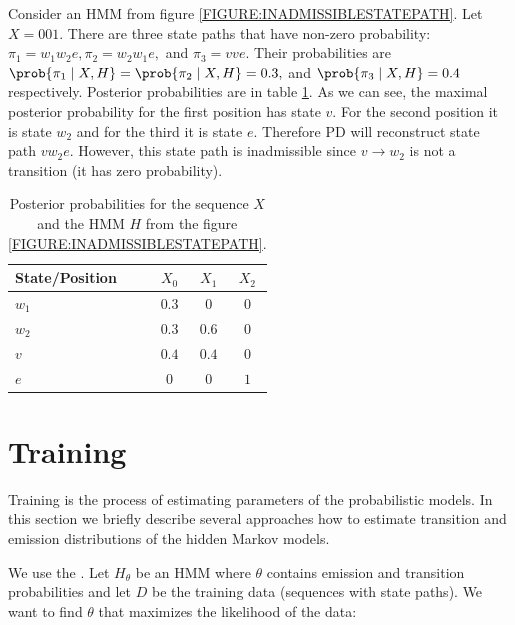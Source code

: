 
\begin{example}
Consider an HMM from figure \ref{FIGURE:INADMISSIBLESTATEPATH}. Let $X=001$. There
are three state paths that have non-zero probability:
$\pi_1=w_1w_2e,\pi_2=w_2w_1e,$ and $\pi_3=vve$. Their probabilities are
$\prob{\pi_1\mid X,H}=\prob{\pi_2\mid X,H}=0.3,$ and $\prob{\pi_3\mid X,H}=0.4$
respectively.
Posterior probabilities are in table \ref{TABLE:INADMISSIBLESTATEPATH}.
As we can see, the maximal posterior probability for the first position has state
$v$. For the second position it is state $w_2$ and for the third it is state
$e$. Therefore PD will reconstruct state path $vw_2e$. However, this state path 
is inadmissible since  $v\to w_2$ is not a transition (it has zero probability).

\begin{table}
\begin{center}
\begin{tabular}{|l|c|c|c|}
\hline
State/Position & $X_0$ & $X_1$ & $X_2$ \\\hline
$w_1$ & $0.3$ & $0$ & $0$ \\\hline
$w_2$ & $0.3$ & $0.6$ & $0$ \\\hline
$v$   & $0.4$ & $0.4$ & $0$\\\hline
$e$  & $0$ & $0$ & $1$ \\\hline
\end{tabular}
\end{center}
\caption[Example of posterior probabilities.]{Posterior probabilities for
the sequence $X$ and the HMM $H$ from the figure \ref{FIGURE:INADMISSIBLESTATEPATH}.
}\label{TABLE:INADMISSIBLESTATEPATH}
\end{table}

\end{example}


\section{Training} 

Training is the process of estimating parameters of the probabilistic models. In this
section we briefly describe several approaches how to estimate transition and
emission distributions of the hidden Markov models.

We use the . Let $H_{\theta}$ be an HMM
where $\theta$ contains emission and transition probabilities and
let $D$ be the training data (sequences with state paths).  We
want to find $\theta$ that maximizes the likelihood of the data:


